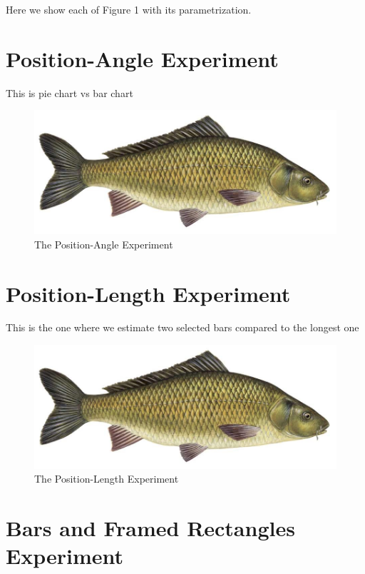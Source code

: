 \documentclass[journal]{vgtc}                %
\begin{document}
Here we show each of Figure 1 with its parametrization.


\section{Position-Angle Experiment}

This is pie chart vs bar chart

\begin{figure}[t]
	  \includegraphics[width=\linewidth]{fish.jpg}
  \caption{The Position-Angle Experiment}
	\label{fig:position_angle_experiment}
\end{figure}

\section{Position-Length Experiment}

This is the one where we estimate two selected bars compared to the longest one

\begin{figure}[t]
	  \includegraphics[width=\linewidth]{fish.jpg}
  \caption{The Position-Length Experiment}
	\label{fig:position_length_experiment}
\end{figure}

\section{Bars and Framed Rectangles Experiment}
\end{document}

